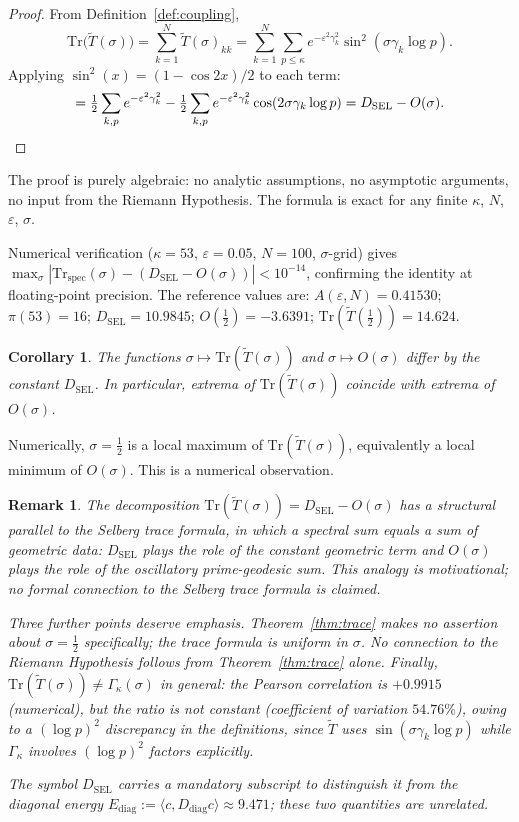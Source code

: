 \documentclass[11pt]{article}
\newtheorem{corollary}[theorem]{Corollary}
\newtheorem*{remark}{Remark}
\newcommand{\Tt}{\widetilde{T}}
\newcommand{\DSEL}{D_{\mathrm{SEL}}}
\newcommand{\Ediag}{E_{\mathrm{diag}}}
\begin{document}
\begin{proof}
From Definition~\ref{def:coupling},
\[
\mathrm{Tr}\bigl(\Tt(\sigma)\bigr)
  = \sum_{k=1}^N \Tt(\sigma)_{kk}
  = \sum_{k=1}^N\sum_{p\leq\kappa}
    e^{-\varepsilon^2\gamma_k^2}\sin^2(\sigma\gamma_k\log p).
\]
Applying $\sin^2(x)=(1-\cos 2x)/2$ to each term:
\[
= \tfrac{1}{2}\sum_{k,p} e^{-\varepsilon^2\gamma_k^2}
  - \tfrac{1}{2}\sum_{k,p} e^{-\varepsilon^2\gamma_k^2}\cos(2\sigma\gamma_k\log p)
  = \DSEL - O(\sigma). \qedhere
\]
\end{proof}

The proof is purely algebraic: no analytic assumptions, no asymptotic
arguments, no input from the Riemann Hypothesis.
The formula is exact for any finite $\kappa$, $N$, $\varepsilon$, $\sigma$.

Numerical verification ($\kappa=53$, $\varepsilon=0.05$, $N=100$,
$\sigma$-grid) gives
$\max_\sigma|\mathrm{Tr}_{\mathrm{spec}}(\sigma)-(\DSEL-O(\sigma))|<10^{-14}$,
confirming the identity at floating-point precision.
The reference values are:
$A(\varepsilon,N)=0.41530$; $\pi(53)=16$;
$\DSEL = 10.9845$; $O(\tfrac{1}{2})=-3.6391$;
$\mathrm{Tr}(\Tt(\tfrac{1}{2}))=14.624$.

\begin{corollary}
\label{cor:extrema}
The functions $\sigma\mapsto\mathrm{Tr}(\Tt(\sigma))$ and
$\sigma\mapsto O(\sigma)$ differ by the constant $\DSEL$.
In particular, extrema of $\mathrm{Tr}(\Tt(\sigma))$ coincide
with extrema of $O(\sigma)$.
\end{corollary}

Numerically, $\sigma=\tfrac{1}{2}$ is a local maximum of
$\mathrm{Tr}(\Tt(\sigma))$, equivalently a local minimum of $O(\sigma)$.
This is a numerical observation.

\begin{remark}
The decomposition $\mathrm{Tr}(\Tt(\sigma))=\DSEL-O(\sigma)$
has a structural parallel to the Selberg trace formula,
in which a spectral sum equals a sum of geometric data:
$\DSEL$ plays the role of the constant geometric term and
$O(\sigma)$ plays the role of the oscillatory prime-geodesic sum.
This analogy is motivational; no formal connection to the
Selberg trace formula is claimed.

Three further points deserve emphasis.
Theorem~\ref{thm:trace} makes no assertion about $\sigma=\tfrac{1}{2}$
specifically; the trace formula is uniform in $\sigma$.
No connection to the Riemann Hypothesis follows from
Theorem~\ref{thm:trace} alone.
Finally, $\mathrm{Tr}(\Tt(\sigma))\neq\Gamma_\kappa(\sigma)$ in general:
the Pearson correlation is $+0.9915$ (numerical), but the ratio is not
constant (coefficient of variation $54.76\%$), owing to a $(\log p)^2$
discrepancy in the definitions, since $\Tt$ uses $\sin(\sigma\gamma_k\log p)$
while $\Gamma_\kappa$ involves $(\log p)^2$ factors explicitly.

The symbol $\DSEL$ carries a mandatory subscript to distinguish it
from the diagonal energy $\Ediag := \langle c,D_{\mathrm{diag}}c\rangle
\approx 9.471$; these two quantities are unrelated.
\end{remark}
\end{document}
